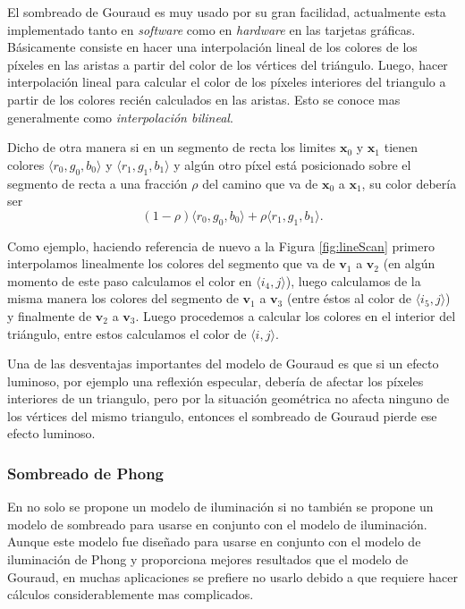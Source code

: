 El sombreado de Gouraud es muy usado por su gran facilidad, actualmente esta implementado tanto en \emph{software} como en \emph{hardware} en las tarjetas gráficas. Básicamente consiste en hacer una interpolación lineal de los colores de los píxeles en las aristas a partir del color de los vértices del triángulo. Luego, hacer interpolación lineal para calcular el color de los píxeles interiores del triangulo a partir de los colores recién calculados en las aristas. Esto se conoce mas generalmente como \emph{interpolación bilineal}.

Dicho de otra manera si en un segmento de recta los limites $\textbf{x}_0$ y $\textbf{x}_1$ tienen colores $\langle r_0, g_0, b_0 \rangle$ y $\langle r_1, g_1, b_1 \rangle$ y algún otro píxel está posicionado sobre el segmento de recta a una fracción $\rho$ del camino que va de $\textbf{x}_0$ a $\textbf{x}_1$, su color debería ser
\begin{equation}
  (1 - \rho) \langle r_0, g_0, b_0 \rangle + \rho \langle r_1, g_1, b_1 \rangle.
 \label{ec:gouraudShading}
\end{equation}

Como ejemplo, haciendo referencia de nuevo a la Figura \ref{fig:lineScan} primero interpolamos linealmente los colores del segmento que va de $\textbf{v}_1$ a $\textbf{v}_2$ (en algún momento de este paso calculamos el color en $\langle i_4, j\rangle$), luego calculamos de la misma manera los colores del segmento de $\textbf{v}_1$ a $\textbf{v}_3$ (entre éstos al color de $\langle i_5, j\rangle$) y finalmente de $\textbf{v}_2$ a $\textbf{v}_3$. Luego procedemos a calcular los colores en el interior del triángulo, entre estos calculamos el color de $\langle i, j\rangle$.

Una de las desventajas importantes del modelo de Gouraud es que si un efecto luminoso, por ejemplo una reflexión especular, debería de afectar los píxeles interiores de un triangulo, pero por la situación geométrica no afecta ninguno de los vértices del mismo triangulo, entonces el sombreado de Gouraud pierde ese efecto luminoso.

\subsubsection{Sombreado de Phong}

En \cite{Phong:Modelo} no solo se propone un modelo de iluminación si no también se propone un modelo de sombreado para usarse en conjunto con el modelo de iluminación. Aunque este modelo fue diseñado para usarse en conjunto con el modelo de iluminación de Phong y proporciona mejores resultados que el modelo de Gouraud, en muchas aplicaciones se prefiere no usarlo debido a que requiere hacer cálculos considerablemente mas complicados.

